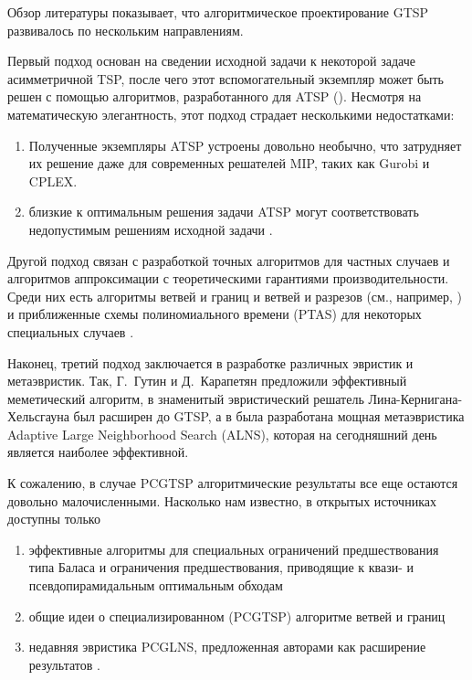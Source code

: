 Обзор литературы показывает, 
что алгоритмическое проектирование GTSP развивалось по нескольким направлениям.

Первый подход основан на сведении исходной задачи к некоторой задаче асимметричной TSP, 
после чего этот вспомогательный экземпляр может быть решен с помощью алгоритмов, 
разработанного для ATSP 
(\cite{LaporteSemet1999, NoonBean1993}). 
Несмотря на математическую элегантность, 
этот подход страдает несколькими недостатками:
\begin{enumerate}
\item
Полученные экземпляры ATSP устроены довольно необычно, 
что затрудняет их решение даже для современных решателей MIP, 
таких как Gurobi и CPLEX.
\item
близкие к оптимальным решения задачи ATSP
могут соответствовать недопустимым решениям исходной задачи 
\cite{KaraGut2012}.
\end{enumerate}

Другой подход связан с разработкой точных алгоритмов для частных случаев 
и алгоритмов аппроксимации с теоретическими гарантиями производительности. 
Среди них есть алгоритмы ветвей и границ и ветвей и разрезов 
(см., например, \cite{FishGonToth1997, Yuan2020}) 
и приближенные схемы полиномиального времени (PTAS) 
для некоторых специальных случаев 
\cite{FerGriSit2006, KhN-PSIM2017}.

Наконец, 
третий подход заключается в разработке 
различных эвристик и метаэвристик. 
Так, Г.~Гутин и Д.~Карапетян \cite{Gutin-2010} 
предложили эффективный меметический алгоритм, 
в \cite{Helsgaun-2015} знаменитый эвристический решатель 
Лина-Кернигана-Хельсгауна был расширен до GTSP, 
а в \cite{SMITH20171} была разработана мощная метаэвристика 
Adaptive Large Neighborhood Search (ALNS), 
которая на сегодняшний день является наиболее эффективной.

К сожалению, в случае PCGTSP 
алгоритмические результаты все еще остаются довольно малочисленными. 
Насколько нам известно, в открытых источниках доступны только
\begin{enumerate}
	\item
	эффективные алгоритмы для специальных ограничений предшествования типа Баласа 
	\cite {Balas-Sim2001, ChenKhKh2016, CKK-IFAC2016} 
	и ограничения предшествования, приводящие к квази- и псевдопирамидальным оптимальным обходам	
	\cite{KhN-AMAI-2020}
	\item
	общие идеи о специализированном (PCGTSP) алгоритме ветвей и границ
	\cite{SALMAN2020163}
	\item
	недавняя эвристика PCGLNS, предложенная авторами 
	\cite{KKP-optima2020} 
	как расширение результатов
	\cite{SMITH20171}. 
\end{enumerate} 

